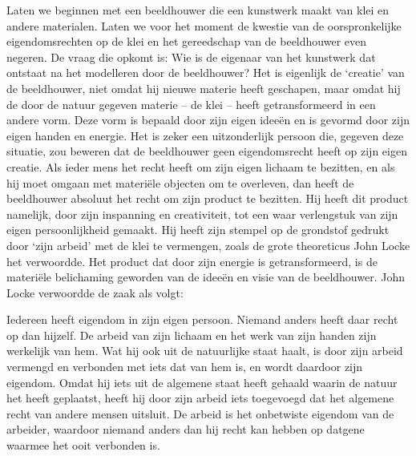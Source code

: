 \documentclass[
  a5paper,
  smalldemyvopaper,10pt,twoside,onecolumn,openright,extrafontsizes,hidelinks]{memoir}
\renewenvironment{quote}%
               {\list{}{\rightmargin=.6cm\leftmargin=.6cm}%
                \itshape \item[]}%
               {\endlist}
\begin{document}
Laten we beginnen met een beeldhouwer die een kunstwerk maakt van klei
en andere materialen. Laten we voor het moment de kwestie van de
oorspronkelijke eigendomsrechten op de klei en het gereedschap van de
beeldhouwer even negeren. De vraag die opkomt is: Wie is de eigenaar van
het kunstwerk dat ontstaat na het modelleren door de beeldhouwer? Het is
eigenlijk de `creatie' van de beeldhouwer, niet omdat hij nieuwe materie
heeft geschapen, maar omdat hij de door de natuur gegeven materie -- de
klei -- heeft getransformeerd in een andere vorm. Deze vorm is bepaald
door zijn eigen ideeën en is gevormd door zijn eigen handen en energie.
Het is zeker een uitzonderlijk persoon die, gegeven deze situatie, zou
beweren dat de beeldhouwer geen eigendomsrecht heeft op zijn eigen
creatie. Als ieder mens het recht heeft om zijn eigen lichaam te
bezitten, en als hij moet omgaan met materiële objecten om te overleven,
dan heeft de beeldhouwer absoluut het recht om zijn product te bezitten.
Hij heeft dit product namelijk, door zijn inspanning en creativiteit,
tot een waar verlengstuk van zijn eigen persoonlijkheid gemaakt. Hij
heeft zijn stempel op de grondstof gedrukt door `zijn arbeid' met de
klei te vermengen, zoals de grote theoreticus John Locke het verwoordde.
Het product dat door zijn energie is getransformeerd, is de materiële
belichaming geworden van de ideeën en visie van de beeldhouwer. John
Locke verwoordde de zaak als volgt:

\begin{quote}
Iedereen heeft eigendom in zijn eigen persoon. Niemand anders heeft daar
recht op dan hijzelf. De arbeid van zijn lichaam en het werk van zijn
handen zijn werkelijk van hem. Wat hij ook uit de natuurlijke staat
haalt, is door zijn arbeid vermengd en verbonden met iets dat van hem
is, en wordt daardoor zijn eigendom. Omdat hij iets uit de algemene
staat heeft gehaald waarin de natuur het heeft geplaatst, heeft hij door
zijn arbeid iets toegevoegd dat het algemene recht van andere mensen
uitsluit. De arbeid is het onbetwiste eigendom van de arbeider, waardoor
niemand anders dan hij recht kan hebben op datgene waarmee het ooit
verbonden is.
\end{quote}
\end{document}
